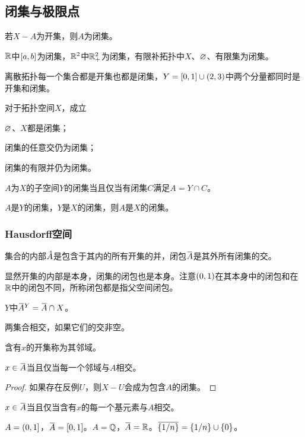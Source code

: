 \documentclass{ctexrep}
\begin{document}
  \subsection{闭集与极限点}
  \begin{definition}
    若$X-A$为开集，则$A$为闭集。
  \end{definition}
  \begin{ex}
  $\mathbb{R}$中$\left[a,b\right]$为闭集，$\mathbb{R}^2$中$\mathbb{R}_+^2$为闭集，有限补拓扑中$X$、$\varnothing$、有限集为闭集。
  \end{ex}
  \begin{ex}
  离散拓扑每一个集合都是开集也都是闭集，$Y=\left[0,1\right]\cup\left(2,3\right)$中两个分量都同时是开集和闭集。
  \end{ex}
  \begin{definition}
  对于拓扑空间$X$，成立
  \begin{cenum}
    \item $\varnothing$、$X$都是闭集；
    \item 闭集的任意交仍为闭集；
    \item 闭集的有限并仍为闭集。
  \end{cenum}
  \end{definition} 
  \begin{theorem}
    $A$为$X$的子空间$Y$的闭集当且仅当有闭集$C$满足$A=Y\cap C$。
  \end{theorem}
  \begin{theorem}
    $A$是$Y$的闭集，$Y$是$X$的闭集，则$A$是$X$的闭集。
  \end{theorem}
  \subsubsection{Hausdorff空间}
  \begin{definition}
    集合的内部$\mathring{A}$是包含于其内的所有开集的并，闭包$\clo{A}$是其外所有闭集的交。
  \end{definition}
  显然开集的内部是本身，闭集的闭包也是本身。注意$\left(0,1\right)$在其本身中的闭包和在$\mathbb{R}$中的闭包不同，所称闭包都是指父空间闭包。
  \begin{theorem}
  $Y$中$\clo{A}^Y = \clo{A} \cap X$。
  \end{theorem}
  \begin{definition}
    两集合相交，如果它们的交非空。
  \end{definition}
  \begin{definition}
    含有$x$的开集称为其邻域。
  \end{definition}
  \begin{theorem}
  \label{thm:sublpoint}
    $x\in \clo{A}$当且仅当每一个邻域与$A$相交。
  \end{theorem}
  \begin{proof}
    如果存在反例$U$，则$X-U$会成为包含$A$的闭集。
  \end{proof}
  \begin{collary}
    $x\in \clo{A}$当且仅当含有$x$的每一个基元素与$A$相交。
  \end{collary}
  \begin{ex}
    $A=\left(0,1\right]$，$\clo{A}=\brac{0,1}$。$A=\mathbb{Q}$，$\clo{A}=\R$。$\clo{\curb{1/n}} = \curb{1/n}\cup\curb{0}$。
  \end{ex}
\end{document}
